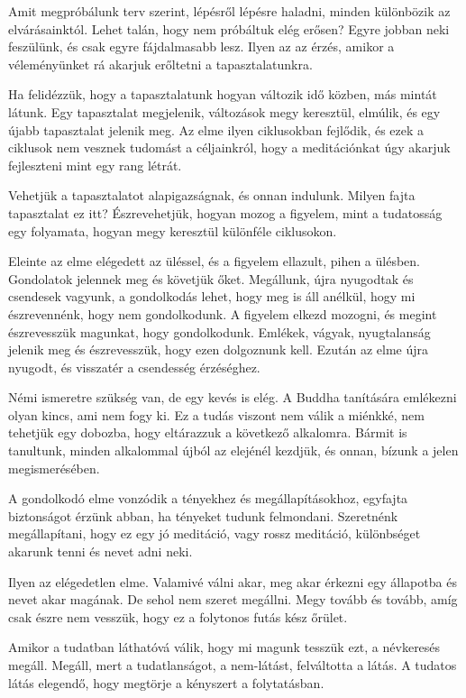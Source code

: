 Amit megpróbálunk terv szerint, lépésről lépésre haladni, minden
különbözik az elvárásainktól. Lehet talán, hogy nem próbáltuk elég
erősen? Egyre jobban neki feszülünk, és csak egyre fájdalmasabb lesz.
Ilyen az az érzés, amikor a véleményünket rá akarjuk erőltetni a
tapasztalatunkra.

Ha felidézzük, hogy a tapasztalatunk hogyan változik idő közben, más
mintát látunk. Egy tapasztalat megjelenik, változások megy keresztül,
elmúlik, és egy újabb tapasztalat jelenik meg. Az elme ilyen ciklusokban
fejlődik, és ezek a ciklusok nem vesznek tudomást a céljainkról, hogy a
meditációnkat úgy akarjuk fejleszteni mint egy rang létrát.

Vehetjük a tapasztalatot alapigazságnak, és onnan indulunk. Milyen fajta
tapasztalat ez itt? Észrevehetjük, hogyan mozog a figyelem, mint a
tudatosság egy folyamata, hogyan megy keresztül különféle ciklusokon.

Eleinte az elme elégedett az üléssel, és a figyelem ellazult, pihen a
ülésben. Gondolatok jelennek meg és követjük őket. Megállunk, újra
nyugodtak és csendesek vagyunk, a gondolkodás lehet, hogy meg is áll
anélkül, hogy mi észrevennénk, hogy nem gondolkodunk. A figyelem elkezd
mozogni, és megint észrevesszük magunkat, hogy gondolkodunk. Emlékek,
vágyak, nyugtalanság jelenik meg és észrevesszük, hogy ezen dolgoznunk
kell. Ezután az elme újra nyugodt, és visszatér a csendesség érzéséghez.

Némi ismeretre szükség van, de egy kevés is elég. A Buddha tanítására
emlékezni olyan kincs, ami nem fogy ki. Ez a tudás viszont nem válik a
miénkké, nem tehetjük egy dobozba, hogy eltárazzuk a következő
alkalomra. Bármit is tanultunk, minden alkalommal újból az elejénél
kezdjük, és onnan, bízunk a jelen megismerésében.

A gondolkodó elme vonzódik a tényekhez és megállapításokhoz, egyfajta
biztonságot érzünk abban, ha tényeket tudunk felmondani. Szeretnénk
megállapítani, hogy ez egy jó meditáció, vagy rossz meditáció,
különbséget akarunk tenni és nevet adni neki.

Ilyen az elégedetlen elme. Valamivé válni akar, meg akar érkezni egy
állapotba és nevet akar magának. De sehol nem szeret megállni. Megy
tovább és tovább, amíg csak észre nem vesszük, hogy ez a folytonos futás
kész őrület.

Amikor a tudatban láthatóvá válik, hogy mi magunk tesszük ezt, a
névkeresés megáll. Megáll, mert a tudatlanságot, a nem-látást,
felváltotta a látás. A tudatos látás elegendő, hogy megtörje a kényszert
a folytatásban.

